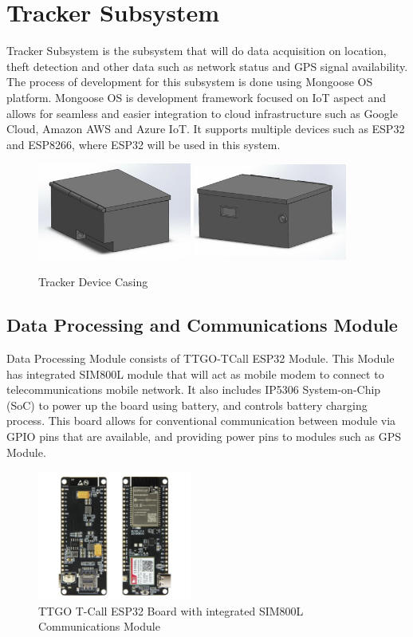 \documentclass[conference]{IEEEtran}
\begin{document}
\section{Tracker Subsystem}
Tracker Subsystem is the subsystem that will do data acquisition on location, theft detection and other data such as network status and GPS signal availability. The process of development for this subsystem is done using Mongoose OS platform. Mongoose OS is development framework focused on IoT aspect and allows for seamless and easier integration to cloud infrastructure such as Google Cloud, Amazon AWS and Azure IoT. It supports multiple devices such as ESP32 and ESP8266, where ESP32 will be used in this system.
\begin{figure}[htbp]
    \centering
    \includegraphics[width=0.45\textwidth]{casing1}
    \includegraphics[width=0.45\textwidth]{casing2}
    \caption{Tracker Device Casing}
    \label{fig2}
\end{figure}

\subsection{Data Processing and Communications Module}
Data Processing Module consists of TTGO-TCall ESP32 Module. This Module has integrated SIM800L module that will act as mobile modem to connect to telecommunications mobile network. It also includes IP5306 System-on-Chip (SoC) to power up the board using battery, and controls battery charging process. This board allows for conventional communication between module via GPIO pins that are available, and providing power pins to modules such as GPS Module.

\begin{figure}[htbp]
    \centering
    \includegraphics[width=0.45\textwidth]{gambaresp32}
    \caption{TTGO T-Call ESP32 Board with integrated SIM800L Communications Module}
    \label{fig3}
\end{figure}
\end{document}
